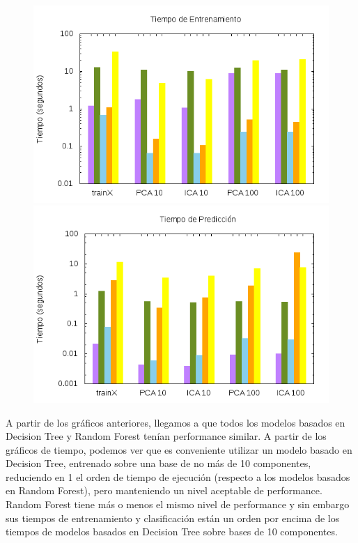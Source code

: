 \documentclass[10pt, a4paper]{article}
\begin{document}
\begin{figure}[H]
  \begin{minipage}{1\textwidth}
  \centering
	\includegraphics[scale=0.5]{../src/data/vtp.png}
	\includegraphics[scale=0.5]{../src/data/vtm.png}
  \end{minipage}
\end{figure}

A partir de los gráficos anteriores, llegamos a que todos los modelos basados en Decision Tree y Random Forest tenían performance similar. A partir de los gráficos de tiempo, podemos ver que es conveniente utilizar un modelo basado en Decision Tree, entrenado sobre una base de no más de 10 componentes, reduciendo en 1 el orden de tiempo de ejecución (respecto a los modelos basados en Random Forest), pero manteniendo un nivel aceptable de performance. Random Forest tiene más o menos el mismo nivel de performance y sin embargo sus tiempos de entrenamiento y clasificación están un orden por encima de los tiempos de modelos basados en Decision Tree sobre bases de 10 componentes.
\end{document}
